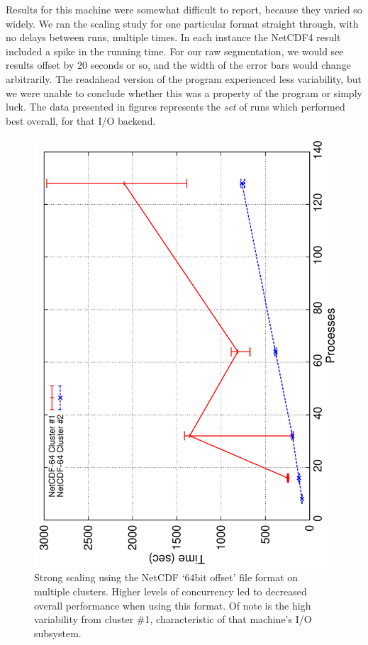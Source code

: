 Results for this machine were somewhat difficult to report, because
they varied so widely.  We ran the scaling study for one particular
format straight through, with no delays between runs, multiple
times.  In each instance the NetCDF4 result included a spike in the
running time.  For our raw segmentation, we would see results offset
by 20 seconds or so, and the width of the error bars would change
arbitrarily.  The readahead version of the program experienced less
variability, but we were unable to conclude whether this was a property
of the program or simply luck.  The data presented in figures
represents the \emph{set} of runs which performed best overall, for
that I/O backend.

\begin{figure}
  \centering
  \includegraphics[angle=270,width=\linewidth]{images/io/n64}
  \caption{Strong scaling using the NetCDF `64bit offset' file format
  on multiple clusters.  Higher levels of concurrency led to decreased
  overall performance when using this format.  Of note is the high
  variability from cluster \#1, characteristic of that machine's I/O
  subsystem.}
  \label{fig:n64}
\end{figure}

